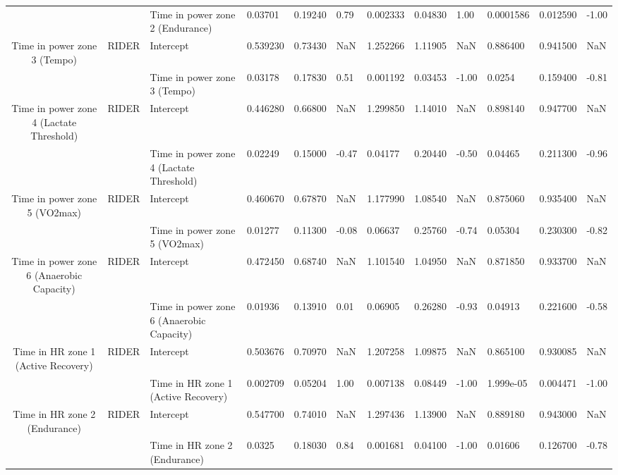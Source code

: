 \begin{tabular}{c}
                                      &       & Time in power zone 2 (Endurance) &   0.03701 &  0.19240 &  0.79 &  0.002333 &  0.04830 &  1.00 &  0.0001586 &  0.012590 & -1.00 \\
Time in power zone 3 (Tempo) & RIDER & Intercept &  0.539230 &  0.73430 &   NaN &  1.252266 &  1.11905 &   NaN &   0.886400 &  0.941500 &   NaN \\
                                      &       & Time in power zone 3 (Tempo) &   0.03178 &  0.17830 &  0.51 &  0.001192 &  0.03453 & -1.00 &     0.0254 &  0.159400 & -0.81 \\
Time in power zone 4 (Lactate Threshold) & RIDER & Intercept &  0.446280 &  0.66800 &   NaN &  1.299850 &  1.14010 &   NaN &   0.898140 &  0.947700 &   NaN \\
                                      &       & Time in power zone 4 (Lactate Threshold) &   0.02249 &  0.15000 & -0.47 &   0.04177 &  0.20440 & -0.50 &    0.04465 &  0.211300 & -0.96 \\
Time in power zone 5 (VO2max) & RIDER & Intercept &  0.460670 &  0.67870 &   NaN &  1.177990 &  1.08540 &   NaN &   0.875060 &  0.935400 &   NaN \\
                                      &       & Time in power zone 5 (VO2max) &   0.01277 &  0.11300 & -0.08 &   0.06637 &  0.25760 & -0.74 &    0.05304 &  0.230300 & -0.82 \\
Time in power zone 6 (Anaerobic Capacity) & RIDER & Intercept &  0.472450 &  0.68740 &   NaN &  1.101540 &  1.04950 &   NaN &   0.871850 &  0.933700 &   NaN \\
                                      &       & Time in power zone 6 (Anaerobic Capacity) &   0.01936 &  0.13910 &  0.01 &   0.06905 &  0.26280 & -0.93 &    0.04913 &  0.221600 & -0.58 \\
Time in HR zone 1 (Active Recovery) & RIDER & Intercept &  0.503676 &  0.70970 &   NaN &  1.207258 &  1.09875 &   NaN &   0.865100 &  0.930085 &   NaN \\
                                      &       & Time in HR zone 1 (Active Recovery) &  0.002709 &  0.05204 &  1.00 &  0.007138 &  0.08449 & -1.00 &  1.999e-05 &  0.004471 & -1.00 \\
Time in HR zone 2 (Endurance) & RIDER & Intercept &  0.547700 &  0.74010 &   NaN &  1.297436 &  1.13900 &   NaN &   0.889180 &  0.943000 &   NaN \\
                                      &       & Time in HR zone 2 (Endurance) &    0.0325 &  0.18030 &  0.84 &  0.001681 &  0.04100 & -1.00 &    0.01606 &  0.126700 & -0.78 \\

\end{tabular}
